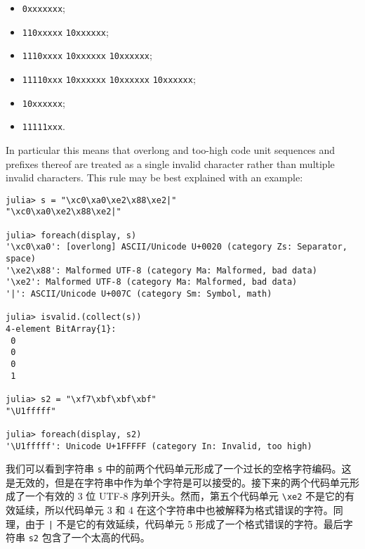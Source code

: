 \begin{itemize}
\item \texttt{0xxxxxxx};


\item \texttt{110xxxxx} \texttt{10xxxxxx};


\item \texttt{1110xxxx} \texttt{10xxxxxx} \texttt{10xxxxxx};


\item \texttt{11110xxx} \texttt{10xxxxxx} \texttt{10xxxxxx} \texttt{10xxxxxx};


\item \texttt{10xxxxxx};


\item \texttt{11111xxx}.

\end{itemize}


In particular this means that overlong and too-high code unit sequences and prefixes thereof are treated as a single invalid character rather than multiple invalid characters. This rule may be best explained with an example:




\begin{verbatim}
julia> s = "\xc0\xa0\xe2\x88\xe2|"
"\xc0\xa0\xe2\x88\xe2|"

julia> foreach(display, s)
'\xc0\xa0': [overlong] ASCII/Unicode U+0020 (category Zs: Separator, space)
'\xe2\x88': Malformed UTF-8 (category Ma: Malformed, bad data)
'\xe2': Malformed UTF-8 (category Ma: Malformed, bad data)
'|': ASCII/Unicode U+007C (category Sm: Symbol, math)

julia> isvalid.(collect(s))
4-element BitArray{1}:
 0
 0
 0
 1

julia> s2 = "\xf7\xbf\xbf\xbf"
"\U1fffff"

julia> foreach(display, s2)
'\U1fffff': Unicode U+1FFFFF (category In: Invalid, too high)
\end{verbatim}



我们可以看到字符串 \texttt{s} 中的前两个代码单元形成了一个过长的空格字符编码。这是无效的，但是在字符串中作为单个字符是可以接受的。接下来的两个代码单元形成了一个有效的 3 位 UTF-8 序列开头。然而，第五个代码单元 \texttt{{\textbackslash}xe2} 不是它的有效延续，所以代码单元 3 和 4 在这个字符串中也被解释为格式错误的字符。同理，由于 \texttt{|} 不是它的有效延续，代码单元 5 形成了一个格式错误的字符。最后字符串 \texttt{s2} 包含了一个太高的代码。



